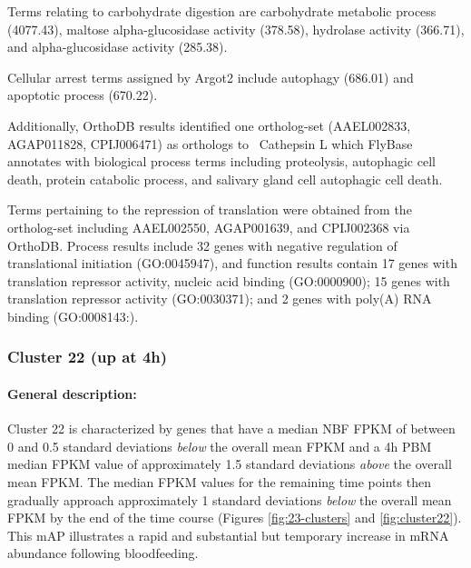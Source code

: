 


Terms relating to carbohydrate digestion are carbohydrate metabolic process (4077.43), maltose alpha-glucosidase activity (378.58), hydrolase activity (366.71), and alpha-glucosidase activity (285.38).

Cellular arrest terms assigned by \gls{Argot2} include autophagy (686.01) and apoptotic process (670.22).

%
Additionally, OrthoDB results identified one ortholog-set (AAEL002833, AGAP011828, CPIJ006471) as orthologs to \Dm\ Cathepsin L which FlyBase annotates with biological process terms including proteolysis, autophagic cell death, protein catabolic process, and salivary gland cell autophagic cell death.
%

Terms pertaining to the repression of translation were obtained from the ortholog-set including AAEL002550, AGAP001639, and CPIJ002368 via OrthoDB.
%
Process results include 32 genes with negative regulation of translational initiation (GO:0045947), and function results contain 17 genes with translation repressor activity, nucleic acid binding (GO:0000900); 15 genes with translation repressor activity (GO:0030371); and 2 genes with  poly(A) RNA binding (GO:0008143:).



\subsubsection{Cluster 22 (up at 4h)}

\paragraph*{General description:}

Cluster 22 is characterized by genes that have a median \gls{NBF} \gls{FPKM} of between 0 and 0.5 standard deviations \textit{below} the overall mean \gls{FPKM} and a 4h \gls{PBM} median \gls{FPKM} value of approximately 1.5 standard deviations \textit{above} the overall mean \gls{FPKM}. The median \gls{FPKM} values for the remaining time points then gradually approach approximately 1 standard deviations \textit{below} the overall mean \gls{FPKM} by the end of the time course (Figures \ref{fig:23-clusters} and \ref{fig:cluster22}).
%
This \gls{mAP} illustrates a rapid and substantial but temporary increase in mRNA abundance following bloodfeeding.
%



